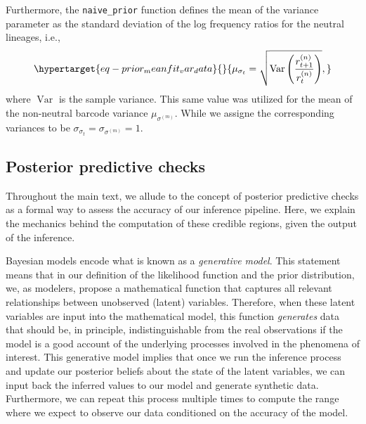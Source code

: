\documentclass[
  letterpaper,
  DIV=11,
  numbers=noendperiod]{scrartcl}
\begin{document}
\begin{refsegment}
Furthermore, the \texttt{naive\_prior} function defines the mean of the
variance parameter as the standard deviation of the log frequency ratios
for the neutral lineages, i.e.,
\begin{equation}\protect\hypertarget{eq-prior_meanfit_var_data}{}{
\mu_{\sigma_t} = \sqrt{
    \operatorname{Var}\left(\frac{r_{t+1}^{(n)}}{r_t^{(n)}}\right)
},
}\label{eq-prior_meanfit_var_data}\end{equation} where
\(\operatorname{Var}\) is the sample variance. This same value was
utilized for the mean of the non-neutral barcode variance
\(\mu_{\sigma^{(m)}}\). While we assigne the corresponding variances to
be \(\sigma_{\sigma_t} = \sigma_{\sigma^{(m)}} = 1\).

\hypertarget{sec-ppc}{%
\subsection{Posterior predictive checks}\label{sec-ppc}}

Throughout the main text, we allude to the concept of posterior
predictive checks as a formal way to assess the accuracy of our
inference pipeline. Here, we explain the mechanics behind the
computation of these credible regions, given the output of the
inference.

Bayesian models encode what is known as a \emph{generative model}. This
statement means that in our definition of the likelihood function and
the prior distribution, we, as modelers, propose a mathematical function
that captures all relevant relationships between unobserved (latent)
variables. Therefore, when these latent variables are input into the
mathematical model, this function \emph{generates} data that should be,
in principle, indistinguishable from the real observations if the model
is a good account of the underlying processes involved in the phenomena
of interest. This generative model implies that once we run the
inference process and update our posterior beliefs about the state of
the latent variables, we can input back the inferred values to our model
and generate synthetic data. Furthermore, we can repeat this process
multiple times to compute the range where we expect to observe our data
conditioned on the accuracy of the model.


\end{refsegment}
\end{document}
